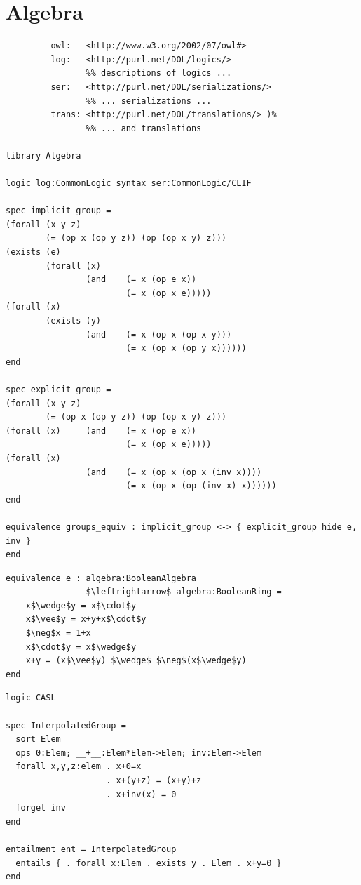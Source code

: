 \documentclass[10pt,fleqn,final]{scrreprt}
\newcommand{\sclause}[1]{\section{#1}}
\begin{document}
\sclause{Algebra}


\begin{lstlisting}[basicstyle=\ttfamily,language=dolText,morekeywords={props,ObjectProperty,Class,DisjointUnionOf,SubClassOf,Characteristics,Transitive,Asymmetric,SubPropertyOf,DisjointClasses,EquivalentTo,inverse,only,forall,iff,if,or,exists,distributed,equivalence},escapechar=@,mathescape]
%prefix( :      <http://www.example.org/alignment#>
         owl:   <http://www.w3.org/2002/07/owl#>
         log:   <http://purl.net/DOL/logics/>
                %% descriptions of logics ...
         ser:   <http://purl.net/DOL/serializations/>
                %% ... serializations ...
         trans: <http://purl.net/DOL/translations/> )%
                %% ... and translations

library Algebra

logic log:CommonLogic syntax ser:CommonLogic/CLIF

spec implicit_group =
(forall (x y z)
        (= (op x (op y z)) (op (op x y) z)))
(exists (e)
        (forall (x)
                (and    (= x (op e x))
                        (= x (op x e)))))
(forall (x)
        (exists (y)
                (and    (= x (op x (op x y)))
                        (= x (op x (op y x))))))
end

spec explicit_group =
(forall (x y z)
        (= (op x (op y z)) (op (op x y) z)))
(forall (x)     (and    (= x (op e x))
                        (= x (op x e)))))
(forall (x)
                (and    (= x (op x (op x (inv x))))
                        (= x (op x (op (inv x) x))))))
end

equivalence groups_equiv : implicit_group <-> { explicit_group hide e, inv }
end
\end{lstlisting}

\begin{lstlisting}[basicstyle=\ttfamily,language=dolText,morekeywords={props,ObjectProperty,Class,DisjointUnionOf,SubClassOf,Characteristics,Transitive,Asymmetric,SubPropertyOf,DisjointClasses,EquivalentTo,inverse,only,forall,iff,if,or,exists,sort,ops,in,approximate,extract,equivalence,spec},escapechar=@,mathescape]
equivalence e : algebra:BooleanAlgebra
                $\leftrightarrow$ algebra:BooleanRing =
    x$\wedge$y = x$\cdot$y
    x$\vee$y = x+y+x$\cdot$y
    $\neg$x = 1+x
    x$\cdot$y = x$\wedge$y
    x+y = (x$\vee$y) $\wedge$ $\neg$(x$\wedge$y)
end
\end{lstlisting}

\begin{lstlisting}[basicstyle=\ttfamily,language=dolText,morekeywords={props,ObjectProperty,Class,DisjointUnionOf,SubClassOf,Characteristics,Transitive,Asymmetric,SubPropertyOf,DisjointClasses,EquivalentTo,inverse,only,forall,iff,if,or,exists,sort,ops,forget,entails,entailment,spec},escapechar=@,mathescape]
logic CASL

spec InterpolatedGroup =
  sort Elem
  ops 0:Elem; __+__:Elem*Elem->Elem; inv:Elem->Elem
  forall x,y,z:elem . x+0=x
                    . x+(y+z) = (x+y)+z
                    . x+inv(x) = 0
  forget inv
end

entailment ent = InterpolatedGroup 
  entails { . forall x:Elem . exists y . Elem . x+y=0 }
end
\end{lstlisting}
\end{document}
